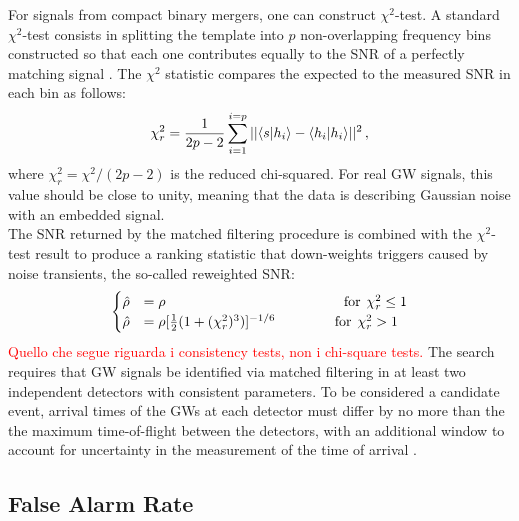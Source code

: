 \documentclass[binding=0.6cm, LaM]{sapthesis}
\newcommand{\fpg}[1]{\textcolor{red}{#1} }
\begin{document}
	For signals from compact binary mergers, one can construct $\chi^2$-test.
	A standard $\chi^2$-test consists in splitting the template into $p$ non-overlapping frequency bins 
	constructed so that each one contributes equally to 
	the SNR of a perfectly matching signal \cite{28, 41}. 
	The $\chi^2$ statistic compares the expected to the measured SNR in each bin as follows:
		\begin{equation}
			\chi^2_r = {1 \over {2p-2}}   \sum_{i=1}^{i=p} || \langle   s|h_i  \rangle -   \langle  h_i|h_i   \rangle ||^2\,,
		\end{equation}
	where $\chi^2_r = \chi^2/(2p-2)$ is the reduced chi-squared.  For real GW signals, this value should be close to unity, 
	meaning that the data is describing Gaussian noise with an embedded signal.\\
	The SNR returned by the matched filtering procedure is combined with the $\chi^2$-test result to produce a ranking statistic 
	that down-weights triggers caused by noise transients, the so-called reweighted SNR:
		\begin{equation}
		\begin{cases}
			\hat \rho &= \rho \hspace*{4.5cm}  \text{for} \hspace*{0.15cm}\chi^2_r \leq 1 \\
			\hat \rho &= \rho[{1 \over 2} (1 + (\chi^2_r)^3)]^{-1/6}  \hspace*{1.5cm}  \text{for} \hspace*{0.15cm} \chi^2_r > 1
		\end{cases}
		\end{equation}
                \fpg{Quello che segue riguarda i consistency tests, non i chi-square tests.} 
	The search requires that GW signals be identified via matched filtering 
	in at least two independent detectors with consistent parameters. 
	To be considered a candidate event, arrival times of the GWs at each detector 
	must differ by no more than the the maximum time-of-flight between the detectors, 
	with an additional window to account for uncertainty in the measurement of the time of arrival \cite{13}.
 
\subsection{False Alarm Rate}
\end{document}
